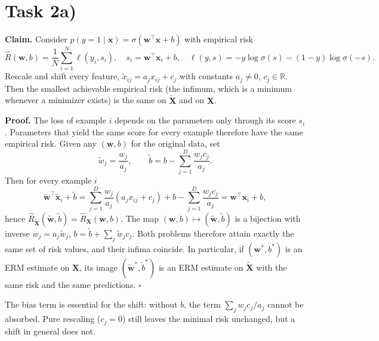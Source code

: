 \documentclass[a4paper,oneside,bibliography=totoc]{scrartcl}
\begin{document}
\section*{Task 2a)}
\begin{answer}[19.5cm]
  \small
  \textbf{Claim.} Consider $p(y=1\mid\mathbf x)=\sigma(\mathbf w^\top\mathbf x+b)$ with empirical risk
  \[
    \hat R(\mathbf w,b)=\frac1N\sum_{i=1}^N \ell(y_i,s_i),\quad s_i=\mathbf w^\top\mathbf x_i+b,\quad
    \ell(y,s)=-y\log\sigma(s)-(1-y)\log\sigma(-s).
  \]
  Rescale and shift every feature, $\tilde x_{ij}=a_j x_{ij}+c_j$ with constants $a_j\neq0$, $c_j\in\mathbb R$.
  Then the smallest achievable empirical risk (the infimum, which is a minimum whenever a minimizer exists)
  is the same on $\tilde{\mathbf X}$ and on $\mathbf X$.

  \textbf{Proof.} The loss of example $i$ depends on the parameters only through its score $s_i$. Parameters
  that yield the same score for every example therefore have the same empirical risk. Given any
  $(\mathbf w,b)$ for the original data, set
  \[
    \tilde w_j=\frac{w_j}{a_j},\qquad \tilde b=b-\sum_{j=1}^D\frac{w_j c_j}{a_j}.
  \]
  Then for every example $i$
  \[
    \tilde{\mathbf w}^\top\tilde{\mathbf x}_i+\tilde b
    =\sum_{j=1}^D\frac{w_j}{a_j}(a_j x_{ij}+c_j)+b-\sum_{j=1}^D\frac{w_j c_j}{a_j}
    =\mathbf w^\top\mathbf x_i+b,
  \]
  hence $\hat R_{\tilde{\mathbf X}}(\tilde{\mathbf w},\tilde b)=\hat R_{\mathbf X}(\mathbf w,b)$. The map
  $(\mathbf w,b)\mapsto(\tilde{\mathbf w},\tilde b)$ is a bijection with inverse $w_j=a_j\tilde w_j$,
  $b=\tilde b+\sum_j\tilde w_j c_j$. Both problems therefore attain exactly the same set of risk values, and
  their infima coincide. In particular, if $(\mathbf w^*,b^*)$ is an ERM estimate on $\mathbf X$, its image
  $(\tilde{\mathbf w}^*,\tilde b^*)$ is an ERM estimate on $\tilde{\mathbf X}$ with the same risk and the
  same predictions. \hfill$\square$

  The bias term is essential for the shift: without $b$, the term $\sum_j w_j c_j/a_j$ cannot be absorbed.
  Pure rescaling ($c_j=0$) still leaves the minimal risk unchanged, but a shift in general does not.


\end{answer}
\end{document}
